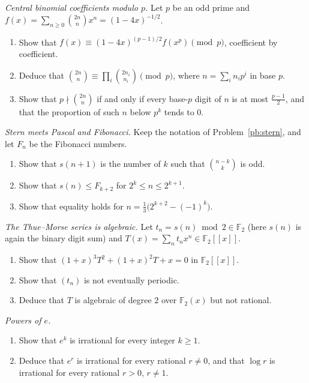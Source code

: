 \begin{exercise}[$\star\star$]\label{pb:centralp}
\emph{Central binomial coefficients modulo $p$.} Let $p$ be an odd prime and $f(x)=\sum_{n\ge0}\binom{2n}nx^n=(1-4x)^{-1/2}$.
\begin{enumerate}[label=(\alph*)]
\item Show that $f(x)\equiv(1-4x)^{(p-1)/2}f(x^p)\pmod p$, coefficient by coefficient.
\item Deduce that $\binom{2n}n\equiv\prod_i\binom{2n_i}{n_i}\pmod p$, where $n=\sum_in_ip^i$ in base $p$.
\item Show that $p\nmid\binom{2n}n$ if and only if every base-$p$ digit of $n$ is at most $\frac{p-1}2$, and that the proportion of
such $n$ below $p^k$ tends to $0$.
\end{enumerate}
\end{exercise}

\begin{exercise}[$\star\star$]\label{pb:sternfib}
\emph{Stern meets Pascal and Fibonacci.} Keep the notation of Problem~\ref{pb:stern}, and let $F_n$ be the Fibonacci numbers.
\begin{enumerate}[label=(\alph*)]
\item Show that $s(n+1)$ is the number of $k$ such that $\binom{n-k}k$ is odd.
\item Show that $s(n)\le F_{k+2}$ for $2^k\le n\le2^{k+1}$.
\item Show that equality holds for $n=\frac13\bigl(2^{k+2}-(-1)^k\bigr)$.
\end{enumerate}
\end{exercise}

\begin{exercise}[$\star\star$]\label{pb:thuemorse}
\emph{The Thue--Morse series is algebraic.} Let $t_n=s(n)\bmod2\in\mathbb F_2$ (here $s(n)$ is again the binary digit sum) and
$T(x)=\sum_nt_nx^n\in\mathbb F_2[[x]]$.
\begin{enumerate}[label=(\alph*)]
\item Show that $(1+x)^3T^2+(1+x)^2T+x=0$ in $\mathbb F_2[[x]]$.
\item Show that $(t_n)$ is not eventually periodic.
\item Deduce that $T$ is algebraic of degree $2$ over $\mathbb F_2(x)$ but not rational.
\end{enumerate}
\end{exercise}

\begin{exercise}[$\star\star$]\label{pb:hermite}
\emph{Powers of $e$.}
\begin{enumerate}[label=(\alph*)]
\item Show that $e^k$ is irrational for every integer $k\ge1$.
\item Deduce that $e^r$ is irrational for every rational $r\ne0$, and that $\log r$ is irrational for every rational $r>0$, $r\ne1$.
\end{enumerate}
\end{exercise}

